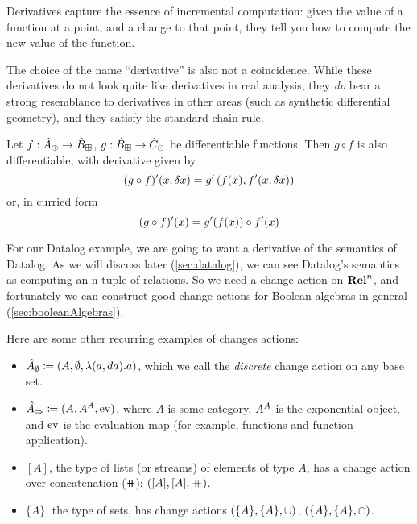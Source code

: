 Derivatives capture the essence of incremental computation: given the value of a
function at a point, and a change to that point, they tell you how to compute
the new value of the function.

The choice of the name ``derivative'' is also not a coincidence. While these
derivatives do not look quite like derivatives in real analysis, they \emph{do}
bear a strong resemblance to derivatives in other areas (such as synthetic differential geometry), and
they satisfy the standard chain rule.

\begin{thm}
  Let $f: \hat{A}_\oplus \rightarrow \hat{B}_\boxplus$, $g: \hat{B}_\boxplus \rightarrow \hat{C}_\odot$ be differentiable functions. Then $g \circ f$ is also
  differentiable, with derivative given by
  \begin{displaymath}
    (g \circ f)'(x, \delta x) = g'\left(f(x), f'(x, \delta x)\right)
  \end{displaymath}
  or, in curried form
  \begin{displaymath}
    (g \circ f)'(x) = g'(f(x)) \circ f'(x)
  \end{displaymath}
\end{thm}

For our Datalog example, we are going to want a derivative of the semantics of
Datalog. As we will discuss later (\cref{sec:datalog}), we can see Datalog's
semantics as computing an n-tuple of relations. So we need a change action on
$\mathbf{Rel}^n$, and fortunately we can construct good change actions for Boolean
algebras in general (\cref{sec:booleanAlgebras}).

Here are some other recurring examples of changes actions:
\begin{itemize}
  \item $\hat{A}_\emptyset \coloneqq (A,\emptyset,\lambda(a, da). a)$,
    which we call the \emph{discrete} change action on any base set.
  \item $\hat{A}_\Rightarrow \coloneqq (A,{A}^{A},\operatorname{ev})$, where $A$ is some
    category, ${A}^{A}$ is the exponential object, and $\operatorname{ev}$ is the evaluation map
    (for example, functions and function application).
  \item $[A]$, the type of lists (or streams) of elements of type $A$, has a
    change action over concatenation ($\doubleplus$): $([A],[A],\mathbin{+\mkern-10mu+})$.
  \item $\{A\}$, the type of sets, has change actions $(\{A\},\{A\},\cup)$, $(\{A\},\{A\},\cap)$.
\end{itemize}

